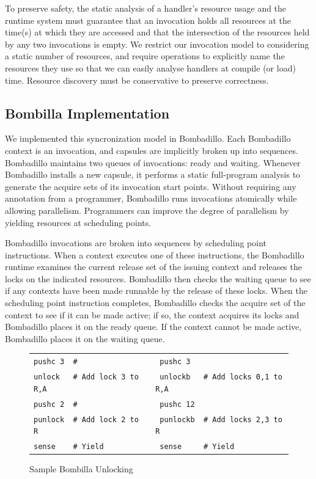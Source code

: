 \documentclass[10pt]{article}
\begin{document}
To preserve safety, the static analysis of a handler's resource usage
and the runtime system must guarantee that an invocation holds all
resources at the time(s) at which they are accessed and that the
intersection of the resources held by any two invocations is empty. We
restrict our invocation model to considering a static number of
resources, and require operations to explicitly name the resources
they use so that we can easily analyse handlers at compile (or load)
time. Resource discovery must be conservative to preserve correctness.

\subsection{Bombilla Implementation}

We implemented this syncronization model in Bombadillo. Each
Bombadillo context is an invocation, and capsules are implicitly
broken up into sequences. Bombadillo maintains two queues of
invocations: ready and waiting. Whenever Bombadillo installs a new
capsule, it performs a static full-program analysis to generate the
acquire sets of its invocation start points. Without requiring any
annotation from a programmer, Bombadillo runs invocations atomically
while allowing parallelism. Programmers can improve the degree of
parallelism by yielding resources at scheduling points.

Bombadillo invocations are broken into sequences by scheduling point
instructions. When a context executes one of these instructions, the
Bombadillo runtime examines the current release set of the issuing
context and releases the locks on the indicated resources. Bombadillo
then checks the waiting queue to see if any contexts have been made
runnable by the release of these locks. When the scheduling point
instruction completes, Bombadillo checks the acquire set of the
context to see if it can be made active; if so, the context acquires
its locks and Bombadillo places it on the ready queue. If the context
cannot be made active, Bombadillo places it on the waiting queue.

\begin{figure}
\centering
\tiny
\begin{tabular}{|l|l|}\hline
\verb;pushc 3  #                   ;&\verb; pushc 3 ;\\
\verb;unlock   # Add lock 3 to R,A ;&\verb; unlockb   # Add locks 0,1 to R,A;\\
\verb;pushc 2  #                   ;&\verb; pushc 12 ;\\
\verb;punlock  # Add lock 2 to R   ;&\verb; punlockb  # Add locks 2,3 to R;\\
\verb;sense    # Yield             ;&\verb; sense     # Yield;\\ \hline

\end{tabular}
\caption{Sample Bombilla Unlocking}
\label{fig:locks}

\end{figure}
\end{document}
